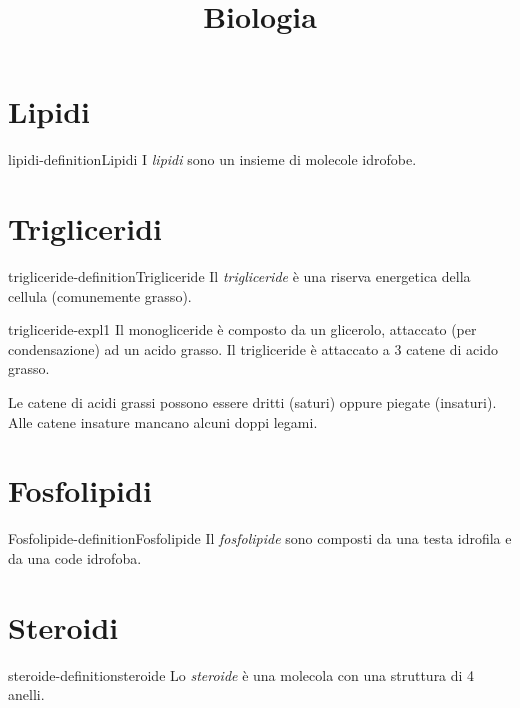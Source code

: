 \documentclass[preview]{standalone}
\begin{document}
\title{Biologia}
\genpage

\section{Lipidi}

\begin{snippetdefinition}{lipidi-definition}{Lipidi}
    I \textit{lipidi} sono un insieme di molecole idrofobe.
\end{snippetdefinition}



\section{Trigliceridi}

\begin{snippetdefinition}{trigliceride-definition}{Trigliceride}
    Il \textit{trigliceride} è una riserva energetica della cellula (comunemente grasso).
\end{snippetdefinition}

\begin{snippet}{trigliceride-expl1}
    Il monogliceride è composto da un glicerolo, attaccato (per condensazione) ad un acido grasso.
    Il trigliceride è attaccato a 3 catene di acido grasso.

    Le catene di acidi grassi possono essere dritti (saturi) oppure piegate (insaturi).
    Alle catene insature mancano alcuni doppi legami.
\end{snippet}

\section{Fosfolipidi}

\begin{snippetdefinition}{Fosfolipide-definition}{Fosfolipide}
    Il \textit{fosfolipide} sono composti da una testa idrofila e da una code idrofoba.
\end{snippetdefinition}


\section{Steroidi}

\begin{snippetdefinition}{steroide-definition}{steroide}
    Lo \textit{steroide} è una molecola con una struttura di 4 anelli.
\end{snippetdefinition}

\end{document}
